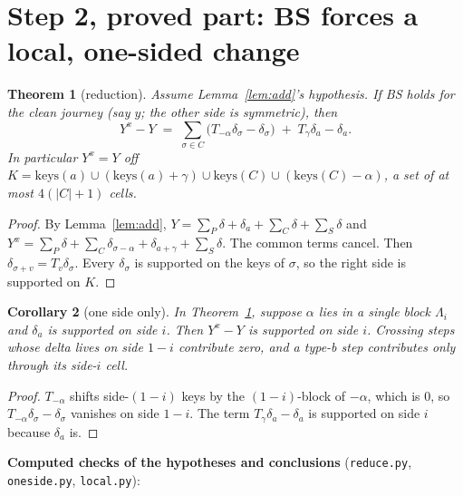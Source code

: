 \documentclass[11pt]{article}
\newtheorem{theorem}{Theorem}\newtheorem{lemma}[theorem]{Lemma}\newtheorem{proposition}[theorem]{Proposition}
\newtheorem{corollary}[theorem]{Corollary}\newtheorem{conjecture}[theorem]{Conjecture}
\theoremstyle{definition}\newtheorem{definition}[theorem]{Definition}\newtheorem{remark}[theorem]{Remark}
\begin{document}
\section{Step 2, proved part: BS forces a local, one-sided change}
\begin{theorem}[reduction]\label{thm:red}
Assume Lemma~\ref{lem:add}'s hypothesis. If BS holds for the clean journey (say $y$; the other side is symmetric), then
\[Y^x-Y\;=\;\sum_{\sigma\in C}\big(T_{-\alpha}\delta_\sigma-\delta_\sigma\big)\;+\;T_{\gamma}\delta_a-\delta_a .\]
In particular $Y^x=Y$ off $K=\mathrm{keys}(a)\cup(\mathrm{keys}(a)+\gamma)\cup\mathrm{keys}(C)\cup(\mathrm{keys}(C)-\alpha)$, a set of at most $4(|C|+1)$ cells.
\end{theorem}
\begin{proof}
By Lemma~\ref{lem:add}, $Y=\sum_P\delta+\delta_a+\sum_C\delta+\sum_S\delta$ and $Y^x=\sum_P\delta+\sum_{C}\delta_{\sigma-\alpha}+\delta_{a+\gamma}+\sum_S\delta$. The common terms cancel.
Then $\delta_{\sigma+v}=T_v\delta_\sigma$. Every $\delta_\sigma$ is supported on the keys of $\sigma$, so the right side is supported on $K$.
\end{proof}
\begin{corollary}[one side only]\label{cor:side}
In Theorem~\ref{thm:red}, suppose $\alpha$ lies in a single block $\Lambda_i$ and $\delta_a$ is supported on side $i$. Then $Y^x-Y$ is supported on side $i$.
Crossing steps whose delta lives on side $1-i$ contribute zero, and a type-b step contributes only through its side-$i$ cell.
\end{corollary}
\begin{proof}
$T_{-\alpha}$ shifts side-$(1-i)$ keys by the $(1-i)$-block of $-\alpha$, which is $0$, so $T_{-\alpha}\delta_\sigma-\delta_\sigma$ vanishes on side $1-i$. The term $T_\gamma\delta_a-\delta_a$ is supported
on side $i$ because $\delta_a$ is.
\end{proof}
\noindent\textbf{Computed checks of the hypotheses and conclusions} (\texttt{reduce.py}, \texttt{oneside.py}, \texttt{local.py}):
\end{document}
